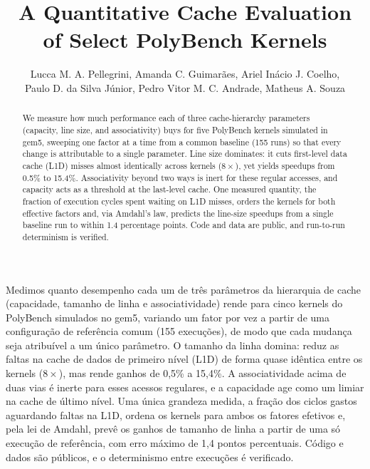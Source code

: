 \documentclass[12pt]{article}
\title{A Quantitative Cache Evaluation of Select PolyBench Kernels}
\author{%
	Lucca M. A. Pellegrini,
	Amanda C. Guimarães,
	Ariel Inácio J. Coelho,\\
	Paulo D. da Silva Júnior,
	Pedro Vitor M. C. Andrade,
	Matheus A. Souza
}
\begin{document}
\maketitle

\begin{abstract}

	We measure how much performance each of three cache-hierarchy parameters
	(capacity, line size, and associativity) buys for five PolyBench kernels
	simulated in gem5, sweeping one factor at a time from a common baseline (155
	runs) so that every change is attributable to a single parameter. Line size
	dominates: it cuts first-level data cache (L1D) misses almost identically
	across kernels (\(8\times\)), yet yields speedups from 0.5\% to 15.4\%.
	Associativity beyond two ways is inert for these regular accesses, and capacity
	acts as a threshold at the last-level cache. One measured quantity, the fraction
	of execution cycles spent waiting on L1D misses, orders the kernels for both
	effective factors and, via Amdahl's law, predicts the line-size speedups from a
	single baseline run to within 1.4 percentage points. Code and data are public,
	and run-to-run determinism is verified.

\end{abstract}

\begin{otherlanguage}{brazilian}
	\begin{resumo}

		Medimos quanto desempenho cada um de três parâmetros da hierarquia de cache
		(capacidade, tamanho de linha e associatividade) rende para cinco kernels do
		PolyBench simulados no gem5, variando um fator por vez a partir de uma
		configuração de referência comum (155 execuções), de modo que cada mudança
		seja atribuível a um único parâmetro. O tamanho da linha domina: reduz as
		faltas na cache de dados de primeiro nível (L1D) de forma quase idêntica
		entre os kernels (\(8\times\)), mas rende ganhos de 0,5\% a 15,4\%. A
		associatividade acima de duas vias é inerte para esses acessos regulares, e
		a capacidade age como um limiar na cache de último nível. Uma única grandeza
		medida, a fração dos ciclos gastos aguardando faltas na L1D, ordena os
		kernels para ambos os fatores efetivos e, pela lei de Amdahl, prevê os ganhos
		de tamanho de linha a partir de uma só execução de referência, com erro
		máximo de 1,4 pontos percentuais. Código e dados são públicos, e o
		determinismo entre execuções é verificado.

	\end{resumo}
\end{otherlanguage}
\end{document}
